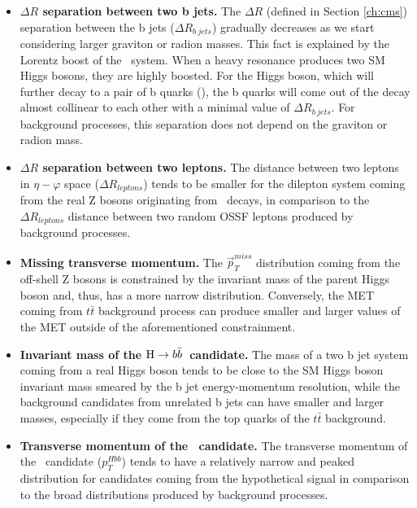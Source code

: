 \begin{itemize}

\item{\bfseries $\Delta R$ separation between two b jets.}
The $\Delta R$ (defined in Section \ref{ch:cms}) separation between the b jets ($\Delta R_{b\ jets}$) gradually decreases as we start considering larger graviton or radion masses. This fact is explained by the Lorentz boost of the \HBB~system. When a heavy resonance produces two SM Higgs bosons, they are highly boosted. For the Higgs boson, which will further decay to a pair of b quarks (\HBB), the b quarks will come out of the decay almost collinear to each other with a minimal value of $\Delta R_{b\ jets}$. For background processes, this separation does not depend on the graviton or radion mass. 

\item{\bfseries $\Delta R$ separation between two leptons.}
The distance between two leptons in $\eta - \varphi$ space ($\Delta R_{leptons}$) tends to be smaller for the dilepton system coming from the real Z bosons originating from \HZZ~decays, in comparison to the $\Delta R_{leptons}$ distance between two random OSSF leptons produced by background processes. 

\item{\bfseries Missing transverse momentum.}
The $\vec{p}^{miss}_T$ distribution coming from the off-shell Z bosons is constrained by the invariant mass of the parent Higgs boson and, thus, has a more narrow distribution. Conversely, the MET coming from $t\bar{t}$ background process can produce smaller and larger values of the MET outside of the aforementioned constrainment. 

\item{\bfseries Invariant mass of the $\mathrm{H}\to b\bar{b}$~candidate.} 
The mass of a two b jet system coming from a real Higgs boson tends to be close to the SM Higgs boson invariant mass smeared by the b jet energy-momentum resolution, while the background candidates from unrelated b jets can have smaller and larger masses, especially if they come from the top quarks of the $t\bar{t}$ background.

\item{\bfseries Transverse momentum of the \HBB~candidate.} 
The transverse momentum of the \HBB~candidate ($p_T^{Hbb}$) tends to have a relatively narrow and peaked distribution for candidates coming from the hypothetical signal in comparison to the broad distributions produced by background processes. 


\end{itemize}
